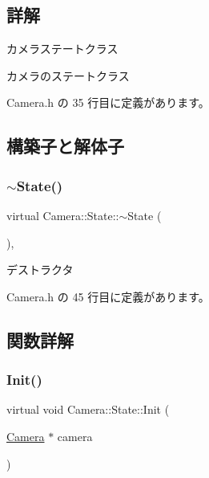 \subsection{詳解}
カメラステートクラス 

カメラのステートクラス 

 Camera.\+h の 35 行目に定義があります。



\subsection{構築子と解体子}
\mbox{\label{class_camera_1_1_state_a61b74bb711d49e26c0f07af65fb74eb9}} 
\subsubsection{\texorpdfstring{$\sim$\+State()}{~State()}}
{\footnotesize\ttfamily virtual Camera\+::\+State\+::$\sim$\+State (\begin{DoxyParamCaption}{ }\end{DoxyParamCaption})\hspace{0.3cm}{\ttfamily [inline]}, {\ttfamily [virtual]}}



デストラクタ 



 Camera.\+h の 45 行目に定義があります。



\subsection{関数詳解}
\mbox{\label{class_camera_1_1_state_aa1b81471ab15e64b3117ffe7de9560ff}} 
\subsubsection{\texorpdfstring{Init()}{Init()}}
{\footnotesize\ttfamily virtual void Camera\+::\+State\+::\+Init (\begin{DoxyParamCaption}\item[{\mbox{\hyperlink{class_camera}{Camera}} $\ast$}]{camera }\end{DoxyParamCaption})\hspace{0.3cm}{\ttfamily [pure virtual]}}



